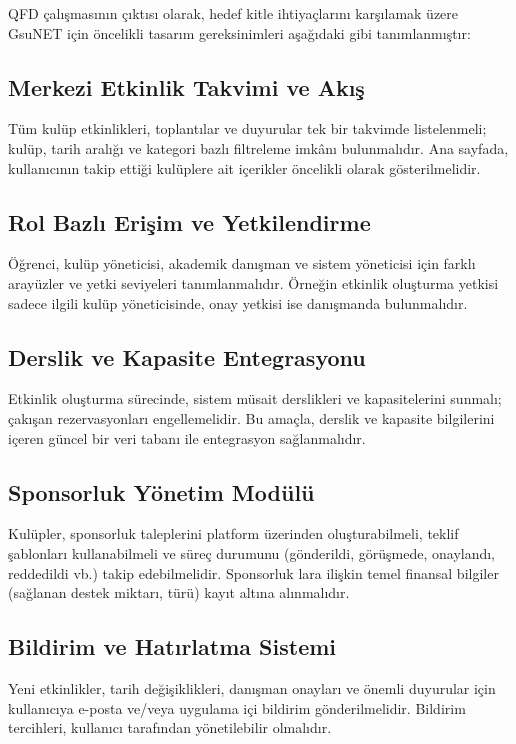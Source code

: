 \documentclass[a4paper,12pt]{report}
\begin{document}
QFD çalışmasının çıktısı olarak, hedef kitle ihtiyaçlarını karşılamak üzere GsuNET için öncelikli tasarım gereksinimleri aşağıdaki gibi tanımlanmıştır:

\subsection{Merkezi Etkinlik Takvimi ve Akış}

Tüm kulüp etkinlikleri, toplantılar ve duyurular tek bir takvimde listelenmeli; kulüp, tarih aralığı ve kategori bazlı filtreleme imkânı bulunmalıdır. Ana sayfada, kullanıcının takip ettiği kulüplere ait içerikler öncelikli olarak gösterilmelidir.

\subsection{Rol Bazlı Erişim ve Yetkilendirme}

Öğrenci, kulüp yöneticisi, akademik danışman ve sistem yöneticisi için farklı arayüzler ve yetki seviyeleri tanımlanmalıdır. Örneğin etkinlik oluşturma yetkisi sadece ilgili kulüp yöneticisinde, onay yetkisi ise danışmanda bulunmalıdır.

\subsection{Derslik ve Kapasite Entegrasyonu}

Etkinlik oluşturma sürecinde, sistem müsait derslikleri ve kapasitelerini sunmalı; çakışan rezervasyonları engellemelidir. Bu amaçla, derslik ve kapasite bilgilerini içeren güncel bir veri tabanı ile entegrasyon sağlanmalıdır.

\subsection{Sponsorluk Yönetim Modülü}

Kulüpler, sponsorluk taleplerini platform üzerinden oluşturabilmeli, teklif şablonları kullanabilmeli ve süreç durumunu (gönderildi, görüşmede, onaylandı, reddedildi vb.) takip edebilmelidir. Sponsorluk lara ilişkin temel finansal bilgiler (sağlanan destek miktarı, türü) kayıt altına alınmalıdır.

\subsection{Bildirim ve Hatırlatma Sistemi}

Yeni etkinlikler, tarih değişiklikleri, danışman onayları ve önemli duyurular için kullanıcıya e-posta ve/veya uygulama içi bildirim gönderilmelidir. Bildirim tercihleri, kullanıcı tarafından yönetilebilir olmalıdır.
\end{document}
